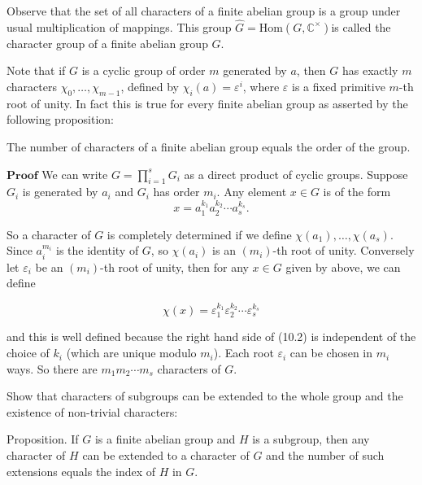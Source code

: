 Observe that the set of all characters of a finite abelian group is a group under usual multiplication of mappings. 
This group \( \hat{G} = \text{Hom}(G, \mathbb{C}^{\times}) \)is called the character group of a finite abelian group \( G \).

Note that if \( G \) is a cyclic group of order \( m \) generated by \( a \), then \( G \) has exactly \( m \) characters \( \chi_0, \ldots, \chi_{m-1} \), defined by \( \chi_i(a) = \varepsilon^i \), where \( \varepsilon \) is a fixed primitive \( m \)-th root of unity. In fact this is true for every finite abelian group as asserted by the following proposition:

The number of characters of a finite abelian group equals the order of the group.

\( \textbf{Proof} \) We can write \( G = \prod_{i=1}^{s} G_i \) as a direct product of cyclic groups. 
Suppose \( G_i \) is generated by \( a_i \) and \( G_i \) has order \( m_i \). Any element \( x \in G \) is of the form
\[
x = a_1^{k_1} a_2^{k_2} \cdots a_s^{k_s}.
\]

So a character of \( G \) is completely determined if we define \( \chi(a_1), \ldots, \chi(a_s) \). Since \( a_i^{m_i} \) is the identity of \( G \), 
so \( \chi(a_i) \) is an \( (m_i) \)-th root of unity. 
Conversely let \( \varepsilon_i \) be an \( (m_i) \)-th root of unity, then for any \( x \in G \) given by above, we can define

\[
\chi(x) = \varepsilon_1^{k_1} \varepsilon_2^{k_2} \cdots \varepsilon_s^{k_s}
\] 

and this is well defined because the right hand side of (10.2) is independent of the choice of \( k_i \) (which are unique modulo \( m_i \)). 
Each root \( \varepsilon_i \) can be chosen in \( m_i \) ways. So there are \( m_1 m_2 \cdots m_s \) characters of \( G \). 


Show that characters of subgroups can be extended to the whole group and the existence of non-trivial characters:

Proposition. If \( G \) is a finite abelian group and \( H \) is a subgroup, then any character of \( H \) can be extended 
to a character of \( G \) and the number of such extensions equals the index of \( H \) in \( G \).

